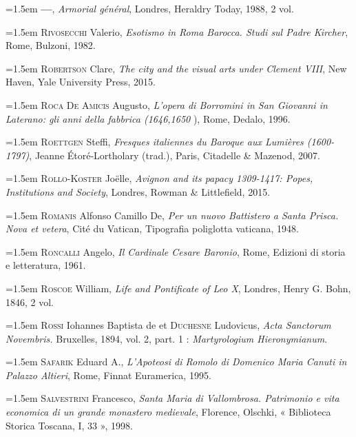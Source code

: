 \documentclass[12pt,twoside,openany]{book}
\newenvironment{PurhBibliography}
  {%
    \par
    \setlength{\parindent}{0pt}%
    \setlength{\leftskip}{0pt}%
  }
  {%
    \par
  }
\begin{document}
\begin{PurhBibliography}
\noindent\hangindent=1.5em \textbf{—}, \textit{Armorial général}, Londres, Heraldry Today, 1988, 2 vol.\par
\noindent\hangindent=1.5em \textsc{Rivosecchi} Valerio, \textit{Esotismo in Roma Barocca. Studi sul Padre Kircher}, Rome, Bulzoni, 1982.\par
\noindent\hangindent=1.5em \textsc{Robertson} Clare, \textit{The city and the visual arts under Clement VIII}, New Haven, Yale University Press, 2015.\par
\noindent\hangindent=1.5em \textsc{Roca De Amicis} Augusto, \textit{L’opera di Borromini in San Giovanni in Laterano: gli anni della fabbrica (1646,1650} ), Rome, Dedalo, 1996.\par
\noindent\hangindent=1.5em \textsc{Roettgen} Steffi, \textit{Fresques italiennes du Baroque aux Lumières (1600-1797)}, Jeanne Étoré-Lortholary (trad.), Paris, Citadelle \& Mazenod, 2007.\par
\noindent\hangindent=1.5em \textsc{Rollo}-\textsc{Koster} Joëlle, \textit{Avignon and its papacy 1309-1417: Popes, Institutions and Society}, Londres, Rowman \& Littlefield, 2015.\par
\noindent\hangindent=1.5em \textsc{Romanis} Alfonso Camillo De, \textit{Per un nuovo Battistero a Santa Prisca. Nova et vetera}, Cité du Vatican, Tipografia poliglotta vaticana, 1948.\par
\noindent\hangindent=1.5em \textsc{Roncalli} Angelo, \textit{Il Cardinale Cesare Baronio}, Rome, Edizioni di storia e letteratura, 1961.\par
\noindent\hangindent=1.5em \textsc{Roscoe} William, \textit{Life and Pontificate of Leo X}, Londres, Henry G. Bohn, 1846, 2 vol.\par
\noindent\hangindent=1.5em \textsc{Rossi} Iohannes Baptista de et \textsc{Duchesne} Ludovicus, \textit{Acta Sanctorum Novembris.} Bruxelles, 1894, vol. 2, part. 1 : \textit{Martyrologium Hieronymianum}.\par
\noindent\hangindent=1.5em \textsc{Safarik} Eduard A., \textit{L’Apoteosi di Romolo di Domenico Maria Canuti in Palazzo Altieri}, Rome, Finnat Euramerica, 1995.\par
\noindent\hangindent=1.5em \textsc{Salvestrini} Francesco, \textit{Santa Maria di Vallombrosa. Patrimonio e vita economica di un grande monastero medievale}, Florence, Olschki, « Biblioteca Storica Toscana, I, 33 », 1998.\par

\end{PurhBibliography}
\end{document}
